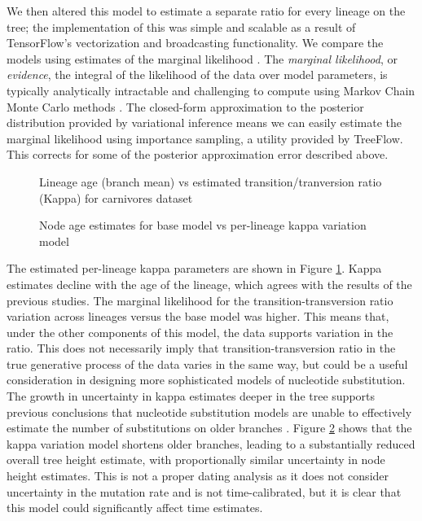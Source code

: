 We then altered this model to estimate a separate ratio for every lineage on the tree; the implementation of this was simple and scalable as a result of TensorFlow's vectorization and broadcasting functionality. We compare the models using estimates of the marginal likelihood \cite{mackay2003information}. The \textit{marginal likelihood}, or \textit{evidence}, the integral of the likelihood of the data over model parameters, is typically analytically intractable and challenging to compute using Markov Chain Monte Carlo methods \cite{xie2011improving}. The closed-form approximation to the posterior distribution provided by variational inference means we can easily estimate the marginal likelihood using importance sampling, a utility provided by TreeFlow. This corrects for some of the posterior approximation error described above.

\begin{figure}
    \centering
    \caption{Lineage age (branch mean) vs estimated transition/tranversion ratio (Kappa) for carnivores dataset}
    \label{fig:carnivoreskappa}
\end{figure}

\begin{figure}
    \centering
    \caption{Node age estimates for base model vs per-lineage kappa variation model}
    \label{fig:carnivorestree}
\end{figure}

The estimated per-lineage kappa parameters are shown in Figure \ref{fig:carnivoreskappa}. Kappa estimates decline with the age of the lineage, which agrees with the results of the previous studies. The marginal likelihood for the transition-transversion ratio variation across lineages versus the base model was higher. This means that, under the other components of this model, the data supports variation in the ratio. This does not necessarily imply that transition-transversion ratio in the true generative process of the data varies in the same way, but could be a useful consideration in designing more sophisticated models of nucleotide substitution. The growth in uncertainty in kappa estimates deeper in the tree supports previous conclusions that nucleotide substitution models are unable to effectively estimate the number of substitutions on older branches \cite{duchene2015declining}. Figure \ref{fig:carnivorestree} shows that the kappa variation model shortens older branches, leading to a substantially reduced overall tree height estimate, with proportionally similar uncertainty in node height estimates. This is not a proper dating analysis as it does not consider uncertainty in the mutation rate and is not time-calibrated, but it is clear that this model could significantly affect time estimates.

